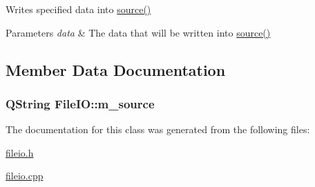 Writes specified data into \hyperlink{class_file_i_o_a8da2b4c6cd72af512e4556203c1c66e7}{source()} 


\begin{DoxyParams}{Parameters}
{\em data} & The data that will be written into \hyperlink{class_file_i_o_a8da2b4c6cd72af512e4556203c1c66e7}{source()} \\
\hline
\end{DoxyParams}


\subsection{Member Data Documentation}
\hypertarget{class_file_i_o_ab8f8edbc97eec6d3cf77e314a8754ef3}{
\subsubsection[{m\+\_\+source}]{\setlength{\rightskip}{0pt plus 5cm}Q\+String File\+I\+O\+::m\+\_\+source\hspace{0.3cm}{\ttfamily [protected]}}}\label{class_file_i_o_ab8f8edbc97eec6d3cf77e314a8754ef3}


The documentation for this class was generated from the following files\+:\begin{DoxyCompactItemize}
\item 
\hyperlink{fileio_8h}{fileio.\+h}\item 
\hyperlink{fileio_8cpp}{fileio.\+cpp}\end{DoxyCompactItemize}
